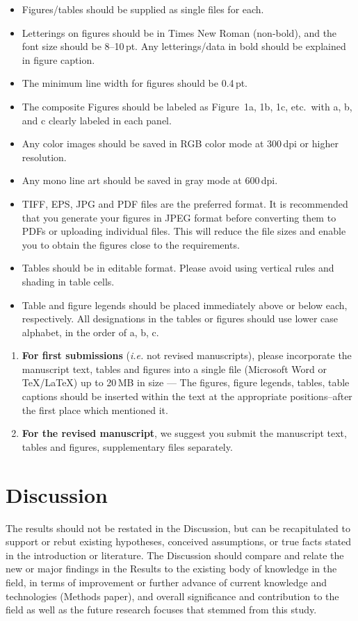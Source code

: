 \documentclass[12pt,a4paper]{article}
\begin{document}
\begin{itemize}
    \item Figures/tables should be supplied as single files for each.
    \item Letterings on figures should be in Times New Roman (non-bold), and the font size should be 8--10\,pt. Any letterings/data in bold should be explained in figure caption.
    \item The minimum line width for figures should be 0.4\,pt.
    \item The composite Figures should be labeled as Figure~1a, 1b, 1c, etc.\ with a, b, and c clearly labeled in each panel.
    \item Any color images should be saved in RGB color mode at 300\,dpi or higher resolution.
    \item Any mono line art should be saved in gray mode at 600\,dpi.
    \item TIFF, EPS, JPG and PDF files are the preferred format. It is recommended that you generate your figures in JPEG format before converting them to PDFs or uploading individual files. This will reduce the file sizes and enable you to obtain the figures close to the requirements.
    \item Tables should be in editable format. Please avoid using vertical rules and shading in table cells.
    \item Table and figure legends should be placed immediately above or below each, respectively. All designations in the tables or figures should use lower case alphabet, in the order of a, b, c.
\end{itemize}

\begin{enumerate}
    \item[\textbf{a.}] \textbf{For first submissions} (\textit{i.e.} not revised manuscripts), please incorporate the manuscript text, tables and figures into a single file (Microsoft Word or TeX/LaTeX) up to 20\,MB in size --- The figures, figure legends, tables, table captions should be inserted within the text at the appropriate positions--after the first place which mentioned it.

    \item[\textbf{b.}] \textbf{For the revised manuscript}, we suggest you submit the manuscript text, tables and figures, supplementary files separately.
\end{enumerate}

\section{Discussion}
The results should not be restated in the Discussion, but can be recapitulated to support or rebut existing hypotheses, conceived assumptions, or true facts stated in the introduction or literature. The Discussion should compare and relate the new or major findings in the Results to the existing body of knowledge in the field, in terms of improvement or further advance of current knowledge and technologies (Methods paper), and overall significance and contribution to the field as well as the future research focuses that stemmed from this study. 
\end{document}
